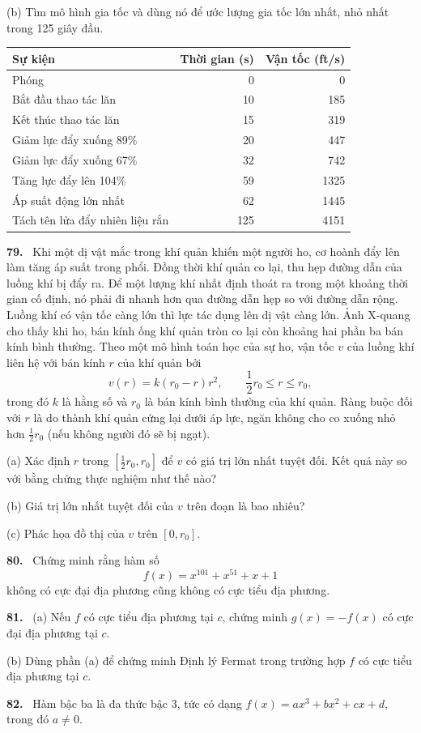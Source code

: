 \documentclass[12pt,a4paper]{article}
\newcommand{\bt}[1]{\par\smallskip\Needspace{5\baselineskip}\noindent\textbf{#1.}\ }
\begin{document}
(b) Tìm mô hình gia tốc và dùng nó để ước lượng gia tốc lớn nhất, nhỏ nhất trong 125 giây đầu.
\begin{center}\small
\begin{tabular}{p{8.1cm}rr}\toprule
Sự kiện&Thời gian (s)&Vận tốc (ft/s)\\\midrule
Phóng&0&0\\
Bắt đầu thao tác lăn&10&185\\
Kết thúc thao tác lăn&15&319\\
Giảm lực đẩy xuống 89\%&20&447\\
Giảm lực đẩy xuống 67\%&32&742\\
Tăng lực đẩy lên 104\%&59&1325\\
Áp suất động lớn nhất&62&1445\\
Tách tên lửa đẩy nhiên liệu rắn&125&4151\\\bottomrule
\end{tabular}\end{center}
\bt{79} Khi một dị vật mắc trong khí quản khiến một người ho, cơ hoành đẩy lên làm tăng áp suất trong phổi. Đồng thời khí quản co lại, thu hẹp đường dẫn của luồng khí bị đẩy ra. Để một lượng khí nhất định thoát ra trong một khoảng thời gian cố định, nó phải đi nhanh hơn qua đường dẫn hẹp so với đường dẫn rộng. Luồng khí có vận tốc càng lớn thì lực tác dụng lên dị vật càng lớn. Ảnh X-quang cho thấy khi ho, bán kính ống khí quản tròn co lại còn khoảng hai phần ba bán kính bình thường. Theo một mô hình toán học của sự ho, vận tốc $v$ của luồng khí liên hệ với bán kính $r$ của khí quản bởi
\[v(r)=k(r_0-r)r^2,\qquad \frac12r_0\le r\le r_0,\]
trong đó $k$ là hằng số và $r_0$ là bán kính bình thường của khí quản. Ràng buộc đối với $r$ là do thành khí quản cứng lại dưới áp lực, ngăn không cho co xuống nhỏ hơn $\frac12r_0$ (nếu không người đó sẽ bị ngạt).

(a) Xác định $r$ trong $[\frac12r_0,r_0]$ để $v$ có giá trị lớn nhất tuyệt đối. Kết quả này so với bằng chứng thực nghiệm như thế nào?

(b) Giá trị lớn nhất tuyệt đối của $v$ trên đoạn là bao nhiêu?

(c) Phác họa đồ thị của $v$ trên $[0,r_0]$.
\bt{80} Chứng minh rằng hàm số
\[f(x)=x^{101}+x^{51}+x+1\]
không có cực đại địa phương cũng không có cực tiểu địa phương.
\bt{81} (a) Nếu $f$ có cực tiểu địa phương tại $c$, chứng minh $g(x)=-f(x)$ có cực đại địa phương tại $c$.

(b) Dùng phần (a) để chứng minh Định lý Fermat trong trường hợp $f$ có cực tiểu địa phương tại $c$.
\bt{82} Hàm bậc ba là đa thức bậc 3, tức có dạng $f(x)=ax^3+bx^2+cx+d$, trong đó $a\ne0$.
\end{document}
